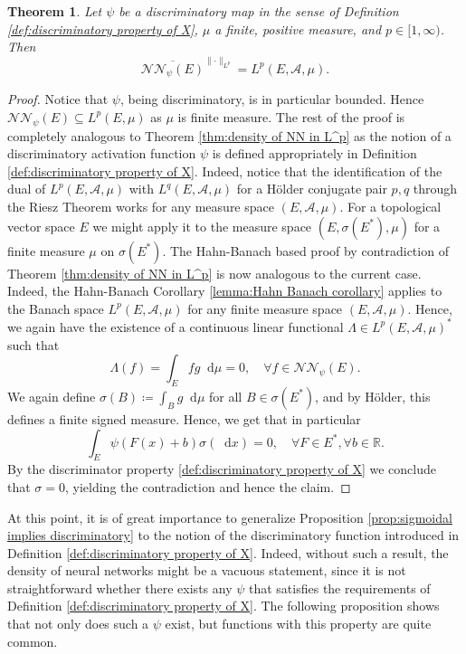 \documentclass[11pt,a4paper,twoside,openany]{report}
\numberwithin{equation}{section}
\newcommand{\diff}{\mathop{}\!\mathrm{d}}
\theoremstyle{plain} %
\newtheorem{theorem}{Theorem}[section]
\theoremstyle{definition} %
\theoremstyle{remark} %
\begin{document}
\begin{theorem}\label{thm:density of NN in L^p on topological vector space}
    Let \(\psi\) be a discriminatory map in the sense of Definition \ref{def:discriminatory property of X}, \(\mu\) a finite, positive measure, and \(p\in[1,\infty)\). Then
    \begin{equation*}
         \overline{\mathcal{NN}_{\psi}(E)}^{\lVert\cdot\rVert_{L^p}}=L^p(E,\mathcal{A},\mu).
    \end{equation*}
\end{theorem} 
\begin{proof}
    Notice that \(\psi\), being discriminatory, is in particular bounded. Hence \(\mathcal{NN}_{\psi}(
    E)\subseteq L^p(E,\mu)\) as \(\mu\) is finite measure. The rest of the proof is completely analogous to Theorem \ref{thm:density of NN in L^p} as the notion of a discriminatory activation function \(\psi\) is defined appropriately in Definition \ref{def:discriminatory property of X}. Indeed, notice that the identification of the dual of \(L^p(E,\mathcal{A},\mu)\) with \(L^q(E,\mathcal{A},\mu)\) for a Hölder conjugate pair \(p,q\) through the Riesz Theorem works for any measure space \((E,\mathcal{A},\mu)\). For a topological vector space \(E\) we might apply it to the measure space \((E,\sigma(E^*),\mu)\) for a finite measure \(\mu\) on \(\sigma(E^*)\). The Hahn-Banach based proof by contradiction of Theorem \ref{thm:density of NN in L^p}  is now analogous to the current case. Indeed, the Hahn-Banach Corollary \ref{lemma:Hahn Banach corollary} applies to the Banach space \(L^p(E,\mathcal{A},\mu)\) for any finite measure space \((E,\mathcal{A},\mu)\). Hence, we again have the existence of a continuous linear functional \(\Lambda\in L^p(E,\mathcal{A},\mu)^*\) such that 
    \begin{equation*}
        \Lambda(f)=\int_{E}fg\diff \mu=0,\quad\forall f\in \mathcal{NN}_{\psi}(E).
    \end{equation*}
    We again define \(\sigma(B)\coloneqq\int_B g\diff \mu\) for all \(B\in\sigma(E^*)\), and by Hölder, this defines a finite signed measure. Hence, we get that in particular 
     \begin{equation*}
        \int_{E}\psi(F(x)+b) \sigma(\diff x)=0,\quad\forall F\in E^*,\forall b\in\mathbb{R}.
\end{equation*}
    By the discriminator property \ref{def:discriminatory property of X} we conclude that \(\sigma=0\), yielding the contradiction and hence the claim. 
\end{proof}
At this point, it is of great importance to generalize Proposition \ref{prop:sigmoidal implies discriminatory} to the notion of the discriminatory function introduced in Definition \ref{def:discriminatory property of X}. Indeed, without such a result, the density of neural networks might be a vacuous statement, since it is not straightforward whether there exists any \(\psi\) that satisfies the requirements of Definition \ref{def:discriminatory property of X}. The following proposition shows that not only does such a \(\psi\) exist, but functions with this property are quite common.
\end{document}
